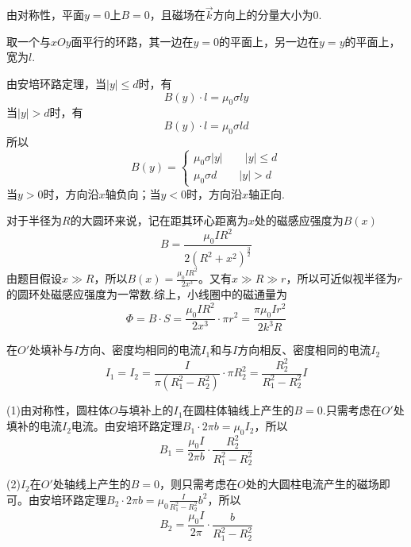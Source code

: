 \documentclass[b5paper,opensource,sourcefont,parskip]{qyxf-book}
\begin{document}
\solve 
由对称性，平面$y=0$上$B=0$，且磁场在$\vec{k}$方向上的分量大小为$0$.

取一个与$xOy$面平行的环路，其一边在$y=0$的平面上，另一边在$y=y$的平面上，宽为$l$.

由安培环路定理，当$|y|\le d$时，有
\begin{equation*}
B(y)\cdot l=\mu_0\sigma ly
\end{equation*}
当$|y|>d$时，有
\begin{equation*}
B(y)\cdot l=\mu_0\sigma ld
\end{equation*}
所以
\begin{equation*}
B(y)=
\begin{cases}
\mu_0\sigma|y|\qquad|y|\le d\\
\mu_0\sigma d\qquad|y|>d
\end{cases}
\end{equation*}
当$y>0$时，方向沿$x$轴负向；当$y<0$时，方向沿$x$轴正向.


\solve
对于半径为$R$的大圆环来说，记在距其环心距离为$x$处的磁感应强度为$B(x)$
\begin{equation*}
B=\frac{\mu_0IR^2}{2(R^2+x^2)^{\frac{3}{2}}}
\end{equation*}
由题目假设$x\gg R$，所以$B(x)=\frac{\mu_0IR^2}{2x^3}$。又有$x\gg R\gg r$，所以可近似视半径为$r$的圆环处磁感应强度为一常数.综上，小线圈中的磁通量为
\begin{equation*}
\Phi=B\cdot S=\frac{\mu_0IR^2}{2x^3}\cdot \pi r^2=\frac{\pi\mu_0Ir^2}{2k^3R}
\end{equation*}


\solve
在$O'$处填补与$I$方向、密度均相同的电流$I_1$和与$I$方向相反、密度相同的电流$I_2$
\begin{equation*}
I_1=I_2=\frac{I}{\pi (R_1^2-R_2^2)}\cdot\pi R_2^2=\frac{R_2^2}{R_1^2-R_2^2}I
\end{equation*}

(1)由对称性，圆柱体$O$与填补上的$I_1$在圆柱体轴线上产生的$B=0$.只需考虑在$O'$处填补的电流$I_2$电流。由安培环路定理$B_1\cdot2\pi b=\mu_0I_2$，所以
\begin{equation*}
B_1=\frac{\mu_0I}{2\pi b}\cdot\frac{R_2^2}{R_1^2-R_2^2}
\end{equation*}

(2)$I_2$在$O'$处轴线上产生的$B=0$，则只需考虑在$O$处的大圆柱电流产生的磁场即可。由安培环路定理$B_2\cdot2\pi b=\mu_0\frac{I}{R_1^2-R_2^2}b^2$，所以
\begin{equation*}
B_2=\frac{\mu_0I}{2\pi}\cdot\frac{b}{R_1^2-R_2^2}
\end{equation*}
\end{document}
